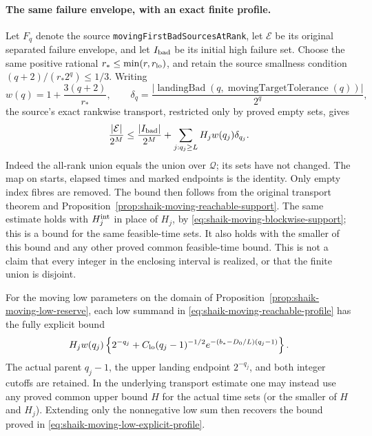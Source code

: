 \documentclass[11pt]{article}
\theoremstyle{remark}\newtheorem{remark}[proposition]{Remark}
\begin{document}
\paragraph{The same failure envelope, with an exact finite profile.}
Let \(F_q\) denote the source \texttt{movingFirstBadSourcesAtRank},
let \(\mathcal E\) be its original separated failure envelope, and let
\(I_{\rm bad}\) be its initial high failure set. Choose the same
positive rational \(r_*\le\min(r,r_{\rm lo})\), and retain the
source smallness condition \((q+2)/(r_*2^q)\le1/3\).
Writing
\[
 w(q)=1+\frac{3(q+2)}{r_*},\qquad
 \delta_q=\frac{|\operatorname{landingBad}
             (q,\operatorname{movingTargetTolerance}(q))|}{2^q},
\]
the source's exact rankwise transport, restricted only by proved
empty sets, gives
\begin{equation}\label{eq:shaik-moving-reachable-profile}
 \frac{|\mathcal E|}{2^M}
 \le\frac{|I_{\rm bad}|}{2^M}
       +\sum_{j:q_j\ge L} H_j w(q_j)\delta_{q_j}.
\end{equation}
Indeed the all-rank union equals the union over \(\mathcal Q\);
its sets have not changed. The map on starts, elapsed times and
marked endpoints is the identity. Only empty index fibres are
removed. The bound then follows from the original transport theorem
and Proposition~\ref{prop:shaik-moving-reachable-support}.
The same estimate holds with \(H_j^{\rm int}\) in place of \(H_j\),
by \eqref{eq:shaik-moving-blockwise-support}; this is a bound for the
same feasible-time sets. It also holds with the smaller of this bound
and any other proved common feasible-time bound.
This is not a claim that every integer in the enclosing interval
is realized, or that the finite union is disjoint.

For the moving low parameters on the domain of
Proposition~\ref{prop:shaik-moving-low-reserve}, each low summand
in \eqref{eq:shaik-moving-reachable-profile} has the fully explicit bound
\[
 H_jw(q_j)\left\{2^{-q_j}
  +C_{\rm lo}(q_j-1)^{-1/2}
       e^{-(b_*-D_0/L)(q_j-1)}\right\}.
\]
The actual parent \(q_j-1\), the upper landing endpoint \(2^{-q_j}\),
and both integer cutoffs are retained. In the underlying transport
estimate one may instead use any proved common upper bound \(H\)
for the actual time sets (or the smaller of \(H\) and \(H_j\)).
Extending only the nonnegative low sum then recovers the bound proved in
\eqref{eq:shaik-moving-low-explicit-profile}.
\end{document}
